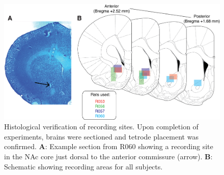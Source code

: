 \documentclass[11pt]{article}
\newcommand{\bsf}[1]{\textbf{#1}}
\begin{document}
 \begin{figure}[ht!]
\centering
\includegraphics[width=\textwidth]{Fig 9 - Histology.png}
\caption{Histological verification of recording sites. Upon completion of
  experiments, brains were sectioned and tetrode placement was
  confirmed. \bsf{A}: Example section from R060 showing a recording site in the
  NAc core just dorsal to the anterior commissure (arrow). \bsf{B}:
  Schematic showing recording areas for all subjects.}
\label{fig:histo}
\end{figure} \clearpage


\end{document}
